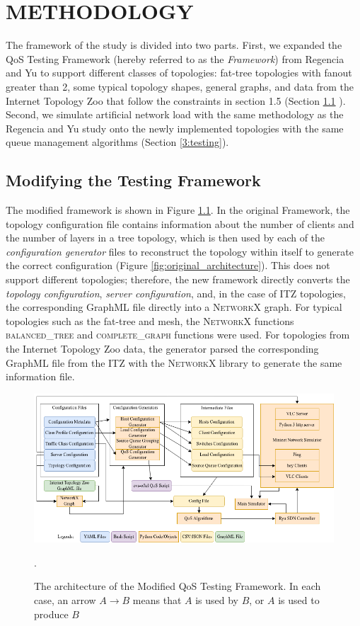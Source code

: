 \chapter{METHODOLOGY}

The framework of the study is divided into two parts. First, we expanded the QoS Testing Framework (hereby referred to as the \textit{Framework}) from Regencia and Yu to support different classes of topologies: fat-tree topologies with fanout greater than 2, some typical topology shapes, general graphs, and data from the Internet Topology Zoo that follow the constraints in section 1.5 (Section \ref{sec:modifying_the_framework}
). Second, we simulate artificial network load with the same methodology as the Regencia and Yu study onto the newly implemented topologies with the same queue management algorithms (Section \ref{3:testing}).

\section{Modifying the Testing Framework} \label{sec:modifying_the_framework}

The modified framework is shown in Figure \ref{fig:new_architecture}. In the original Framework, the topology configuration file contains information about the number of clients and the number of layers in a tree topology, which is then used by each of the \textit{configuration generator} files to reconstruct the topology within itself to generate the correct configuration (Figure \ref{fig:original_architecture}). This does not support different topologies; therefore, the new framework directly converts the \textit{topology configuration}, \textit{server configuration}, and, in the case of ITZ topologies, the corresponding GraphML file directly into a \textsc{NetworkX} graph. For typical topologies such as the fat-tree and mesh, the \textsc{NetworkX} functions \textsc{balanced\_tree} and \textsc{complete\_graph} functions were used. For topologies from the Internet Topology Zoo data, the generator parsed the corresponding GraphML file from the ITZ with the \textsc{NetworkX} library to generate the same information file.

\begin{figure}[htbp!]
    \centering
    \includegraphics[width=\textwidth]{Figures/SDN QoS Testing Framework.drawio.png}
    \caption{The architecture of the Modified QoS Testing Framework. In each case, an arrow $A \rightarrow B$ means that $A$ is used by $B$, or $A$ is used to produce $B$}.
    \label{fig:new_architecture}
\end{figure}

